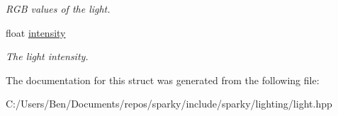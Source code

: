 \begin{DoxyCompactItemize}
\begin{DoxyCompactList}\small\item\em R\+GB values of the light. \end{DoxyCompactList}\item 
float \hyperlink{structsparky_1_1_s_p_a_r_k_y___b_a_s_e___l_i_g_h_t___d_e_s_c_a3e2f83fe7f13727f235e957debb54634}{intensity}\hypertarget{structsparky_1_1_s_p_a_r_k_y___b_a_s_e___l_i_g_h_t___d_e_s_c_a3e2f83fe7f13727f235e957debb54634}{}\label{structsparky_1_1_s_p_a_r_k_y___b_a_s_e___l_i_g_h_t___d_e_s_c_a3e2f83fe7f13727f235e957debb54634}

\begin{DoxyCompactList}\small\item\em The light intensity. \end{DoxyCompactList}\end{DoxyCompactItemize}


The documentation for this struct was generated from the following file\+:\begin{DoxyCompactItemize}
\item 
C\+:/\+Users/\+Ben/\+Documents/repos/sparky/include/sparky/lighting/light.\+hpp\end{DoxyCompactItemize}
